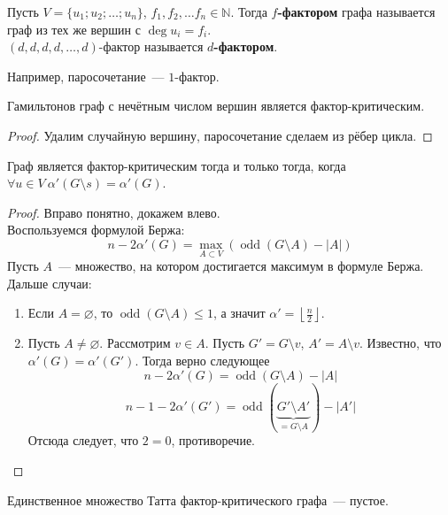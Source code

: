 \documentclass{article}
\begin{document}
    \begin{definition}
        Пусть $V=\{u_1;u_2;\ldots;u_n\}$, $f_1,f_2,\ldots f_n\in\mathbb N$. Тогда \textbf{$f$-фактором} графа называется граф из тех же вершин с $\deg u_i=f_i$.\\
        $(d,d,d,d,\ldots,d)$-фактор называется \textbf{$d$-фактором}.
    \end{definition}
    \begin{example}
        Например, паросочетание~--- $1$-фактор.
    \end{example}
    \begin{claim}
        Гамильтонов граф с нечётным числом вершин является фактор-критическим.
    \end{claim}
    \begin{proof}
        Удалим случайную вершину, паросочетание сделаем из рёбер цикла.
    \end{proof}
    \begin{claim}
        Граф является фактор-критическим тогда и только тогда, когда $\forall u\in V~\alpha'(G\setminus s)=\alpha'(G)$.
    \end{claim}
    \begin{proof}
        Вправо понятно, докажем влево.\\
        Воспользуемся формулой Бержа:
        $$
        n-2\alpha'(G)=\max\limits_{A\subset V}(\operatorname{odd}(G\setminus A)-|A|)
        $$
        Пусть $A$~--- множество, на котором достигается максимум в формуле Бержа. Дальше случаи:
        \begin{enumerate}
            \item Если $A=\varnothing$, то $\operatorname{odd}(G\setminus A)\leqslant1$, а значит $\alpha'=\left\lfloor\frac n2\right\rfloor$.
            \item Пусть $A\neq\varnothing$. Рассмотрим $v\in A$. Пусть $G'=G\setminus v$, $A'=A\setminus v$. Известно, что $\alpha'(G)=\alpha'(G')$. Тогда верно следующее
            $$
            n-2\alpha'(G)=\operatorname{odd}(G\setminus A)-|A|
            $$
            $$
            n-1-2\alpha'(G')=\operatorname{odd}(\underbrace{G'\setminus A'}_{=G\setminus A})-|A'|
            $$
            Отсюда следует, что $2=0$, противоречие.
        \end{enumerate}
    \end{proof}
    \begin{corollary}
        Единственное множество Татта фактор-критического графа~--- пустое.
    \end{corollary}
\end{document}
